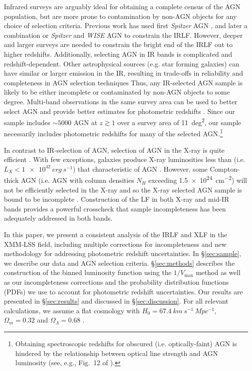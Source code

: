\documentclass[twocolumn, trackchanges]{aastex63}
\begin{document}
Infrared surveys are arguably ideal for obtaining a complete census of the AGN population, but are more prone to contamination by non-AGN objects for any choice of selection criteria.
Previous work  has used first \textit{Spitzer} AGN \citep{lacy_spitzer_2015},  and later a combination or \textit{Spitzer} and \textit{WISE} AGN \citep{2018ApJ...861...37G} to constrain the IRLF.
However, deeper and larger surveys are needed to constrain the bright end of the IRLF out to higher redshifts.
Additionally, selecting AGN in IR bands is complicated and redshift-dependent.
Other astrophysical sources (e.g. star forming galaxies) can have similar or larger emission in the IR,  resulting in trade-offs in reliability and completeness in AGN selection techniques \citep[e.g.,][]{2014A&A...562A.144M,2020NatAs...4..352L,hatziminaoglou_sloan_2005}
Thus, any IR-selected AGN sample is likely to be either incomplete or contaminated by non-AGN objects to some degree.
Multi-band observations in the same survey area can be used to better select AGN and provide better estimates for photometric redshifts \citep{laigle2016ApJS..224...24L, duncanI2018MNRAS.473.2655D, duncanII2018MNRAS.477.5177D, salvato_many_2019}.
Since our sample includes $\sim 5000$ AGN at $z\gtrsim 1$ over a survey area of \SI{11}{deg^2}, our sample necessarily includes photometric redshifts for many of the selected AGN.\footnote{Obtaining spectroscopic redshifts for obscured (i.e. optically-faint) AGN is hindered by the relationship between optical line strength and AGN luminosity (see, e.g., Fig.~12 of \cite{lacy_spitzer_2013}).}

In contrast to IR-selection of AGN, selection of AGN in the X-ray is quite efficient \citep[e.g.,][]{brandt2015A&ARv..23....1B}.
With few exceptions, galaxies produce X-ray luminosities less than (i.e. $L_X < \SI{1e42}{erg~s^{-1}}$) that characteristic of AGN \citep{mineo_x-ray_2012}.
However, some Compton-thick AGN (i.e. AGN with column densities $N_H$ exceeding \SI{1.5e24}{cm^{-2}}) will not be efficiently selected in the X-ray and so the X-ray selected AGN sample is bound to be incomplete \citep{hickox_obscured_2018}.
Construction of the LF in both X-ray and mid-IR bands provides a powerful crosscheck that sample incompleteness has been adequately addressed in both bands.

In this paper, we present a consistent analysis of the IRLF and XLF in the XMM-LSS field, including multiple corrections for incompleteness and new methodology for addressing photometric redshift uncertainties.
In \S\ref{sec:sample}, we describe our data and AGN selection criteria.
\S\ref{sec:methods} describes the construction of the binned luminosity function using the $1/V_\mathrm{max}$ method as well as our incompleteness corrections and the probability distribution functions (PDFs) we use to account for photometric redshift uncertainties.
Our results are presented in \S\ref{sec:results} and discussed in \S\ref{sec:discussion}.
For all relevant calculations, we assume a flat cosmology with $H_0=\SI{67.4}{km~s^{-1}~Mpc^{-1}}$, $\Omega_m = 0.32$ and $\Omega_\Lambda=0.68$ \citep{planck_collaboration_planck}.
\end{document}
